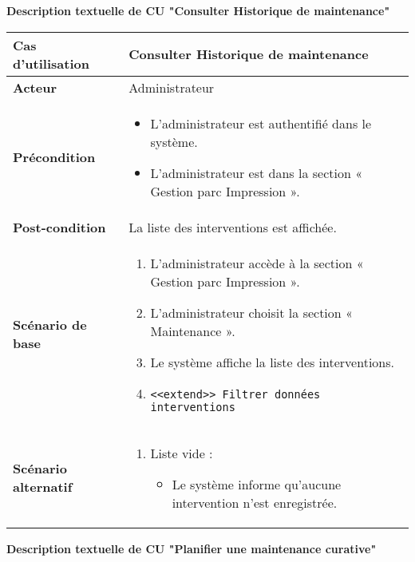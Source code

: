 \documentclass[a4paper,11pt]{report}
\begin{document}
\textbf{Description textuelle de CU "Consulter Historique de maintenance"}

\begin{tabularx}{\textwidth}{|>{\bfseries}l|X|}
\hline
Cas d’utilisation    & Consulter Historique de maintenance \\
\hline
Acteur               & Administrateur \\
\hline
Précondition         &
\begin{itemize}[left=0pt]
  \item L’administrateur est authentifié dans le système.
  \item  L’administrateur est dans la section « Gestion parc Impression ».
\end{itemize} \\
\hline
Post-condition       & La liste des interventions est affichée. \\
\hline
Scénario de base     &
\begin{enumerate}[left=0pt]
  \item L’administrateur accède à la section « Gestion parc Impression ».
  \item  L’administrateur choisit la section « Maintenance ».
  \item Le système affiche la liste des interventions.
  \item \texttt{<<extend>> Filtrer données interventions}
\end{enumerate} \\
\hline
Scénario alternatif   &
\begin{enumerate}[label=\arabic*.a,wide=0pt]
  \item Liste vide :
    \begin{itemize}[left=1em]
      \item Le système informe qu’aucune intervention n’est enregistrée.
    \end{itemize}
\end{enumerate} \\
\hline
\end{tabularx}


\textbf{Description textuelle de CU "Planifier une maintenance curative"}
\end{document}
